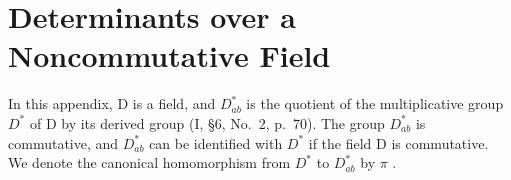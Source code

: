 \chapter{Determinants over a Noncommutative Field}

In this appendix, D is a field, and \(D_{ab}^{*}\) is the quotient of the multiplicative group \(D^{*}\) of D by its derived group (I, §6, No.~2, p.~70). The group \(D_{ab}^{*}\) is commutative, and \(D_{ab}^{*}\) can be identified with \(D^{*}\) if the field D is commutative. We denote the canonical homomorphism from \(D^{*}\) to \(D_{ab}^{*}\) by \(\pi\) .

